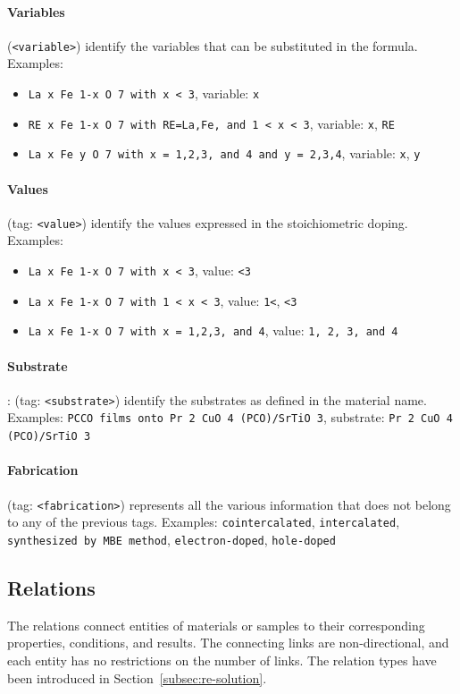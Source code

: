 \paragraph{Variables} (\texttt{<variable>}) identify the variables that can be substituted in the formula. Examples: 
\begin{itemize}
    \item \texttt{La x Fe 1-x O 7 with x < 3}, variable: \texttt{x}
    \item \texttt{RE x Fe 1-x O 7 with RE=La,Fe, and 1 < x < 3}, variable: \texttt{x}, \texttt{RE}
    \item \texttt{La x Fe y O 7 with x = 1,2,3, and 4 and y = 2,3,4}, variable: \texttt{x}, \texttt{y}
\end{itemize}

\paragraph{Values} (tag: \texttt{<value>}) identify the values expressed in the stoichiometric doping. Examples:
\begin{itemize}
    \item \texttt{La x Fe 1-x O 7 with x < 3}, value: \texttt{<3}
    \item \texttt{La x Fe 1-x O 7 with 1 < x < 3}, value: \texttt{1<}, \texttt{<3}
    \item \texttt{La x Fe 1-x O 7 with x = 1,2,3, and 4}, value: \texttt{1, 2, 3, and 4}
\end{itemize}

\paragraph{Substrate}: (tag: \texttt{<substrate>}) identify the substrates as defined in the material name. Examples: \texttt{PCCO films onto Pr 2 CuO 4 (PCO)/SrTiO 3}, substrate: \texttt{Pr 2 CuO 4 (PCO)/SrTiO 3}

\paragraph{Fabrication} (tag: \texttt{<fabrication>}) represents all the various information that does not belong to any of the previous tags. Examples: \texttt{cointercalated}, \texttt{intercalated}, \texttt{synthesized by MBE method}, \texttt{electron-doped}, \texttt{hole-doped}


\subsection{Relations}
\label{relations}
The relations connect entities of materials or samples to their corresponding properties, conditions, and results. 
The connecting links are non-directional, and each entity has no restrictions on the number of links. 
The relation types have been introduced in Section~\ref{subsec:re-solution}.


